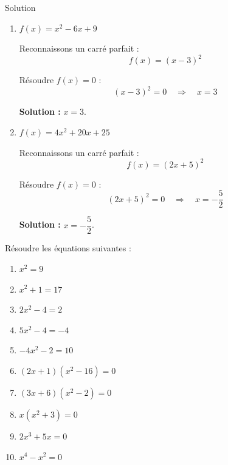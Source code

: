 \documentclass[a4paper,12pt]{article}
\begin{document}
\begin{solutionbox}{Solution}
\begin{enumerate}
    \textbf{Solution :} \( x = \dfrac{5}{2} \) ou \( x = \dfrac{3}{4} \).

    \item \( f(x) = x^2 - 6x + 9 \)

    Reconnaissons un carré parfait :
    \[
    f(x) = (x - 3)^2
    \]

    Résoudre \( f(x) = 0 \) :
    \[
    (x - 3)^2 = 0 \quad \Rightarrow \quad x = 3
    \]

    \textbf{Solution :} \( x = 3 \).

    \item \( f(x) = 4x^2 + 20x + 25 \)

    Reconnaissons un carré parfait :
    \[
    f(x) = (2x + 5)^2
    \]

    Résoudre \( f(x) = 0 \) :
    \[
    (2x + 5)^2 = 0 \quad \Rightarrow \quad x = -\dfrac{5}{2}
    \]

    \textbf{Solution :} \( x = -\dfrac{5}{2} \).

\end{enumerate}
\end{solutionbox}

\begin{exercice}[title=Exercice 10]
Résoudre les équations suivantes :

\begin{enumerate}
    \item \( x^2 = 9 \)
    \item \( x^2 + 1 = 17 \)
    \item \( 2x^2 - 4 = 2 \)
    \item \( 5x^2 - 4 = -4 \)
    \item \( -4x^2 - 2 = 10 \)
    \item \( (2x + 1)(x^2 - 16) = 0 \)
    \item \( (3x + 6)(x^2 - 2) = 0 \)
    \item \( x(x^2 + 3) = 0 \)
    \item \( 2x^3 + 5x = 0 \)
    \item \( x^4 - x^2 = 0 \)
\end{enumerate}
\end{exercice}
\end{document}
